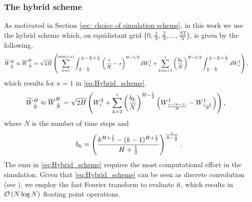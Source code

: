 \subsubsection{The hybrid scheme}\label{sec: The hybrid scheme}
As motivated in Section  \ref{sec: choice of simulation scheme}, in this work we use the hybrid scheme\red{,} which,  on  equidistant grid $\{0,\frac{1}{N},\frac{2}{N},\dots,\frac{NT}{N}\}$, is given by 
the following,
\begin{align}\label{eq:Hybrid_scheme_pre}
\widetilde{W}^H_{\frac{i}{N}} \approx \overline{W}^H_{\frac{i}{N}}&= \sqrt{2H} \left(  \sum_{k=1}^{\min(i,\kappa)} \int_{\frac{i}{N}-\frac{k}{N}}^{\frac{i}{N}-\frac{k}{N}+\frac{1}{N}} \left(\frac{i}{N}-s\right)^{H - 1/2} dW^1_s+\sum_{k=\kappa+1}^{i} \left(\frac{b_k}{N}\right)^{H - 1/2}  \int_{\frac{i}{N}-\frac{k}{N}}^{\frac{i}{N}-\frac{k}{N}+\frac{1}{N}} dW^1_s \right) ,
\end{align}
which results for $\kappa=1$  in \eqref{eq:Hybrid_scheme}.
\begin{align}\label{eq:Hybrid_scheme}
\widetilde{W}^H_{\frac{i}{N}} \approx \overline{W}^H_{\frac{i}{N}}&= \sqrt{2H} \left(  W^2_i+\sum_{k=2}^{i} \left(\frac{b_k}{N}\right)^{H-\frac{1}{2}} \left(W_{\frac{i-(k-1)}{N}}^1-W_{\frac{i-k}{N}}^1\right)\right),
\end{align}
where $N$ is the number of time steps and 
$$ b_k=\left(\frac{k^{H+\frac{1}{2}}-(k-1)^{H+\frac{1}{2} }}{H+\frac{1}{2}}\right)^{\frac{1}{H-\frac{1}{2}}} .$$
The sum in \eqref{eq:Hybrid_scheme} requires the most computational effort in the simulation. Given that \eqref{eq:Hybrid_scheme} can be seen as discrete convolution  (see \cite{bennedsen2017hybrid}), we employ the fast Fourier transform to evaluate it, which results in  ${\mathcal{O}}\left(N \log N\right)$ floating point operations.

